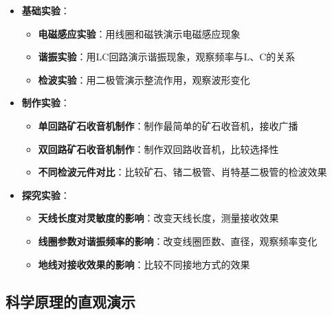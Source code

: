 \documentclass[12pt,UTF8]{ctexbook}
\begin{document}
\begin{itemize}[leftmargin=3.5em]
    \item \textbf{基础实验}：
        \begin{itemize}[leftmargin=3.5em]
            \item \textbf{电磁感应实验}：用线圈和磁铁演示电磁感应现象
            \item \textbf{谐振实验}：用LC回路演示谐振现象，观察频率与L、C的关系
            \item \textbf{检波实验}：用二极管演示整流作用，观察波形变化
        \end{itemize}
    \item \textbf{制作实验}：
        \begin{itemize}[leftmargin=3.5em]
            \item \textbf{单回路矿石收音机制作}：制作最简单的矿石收音机，接收广播
            \item \textbf{双回路矿石收音机制作}：制作双回路收音机，比较选择性
            \item \textbf{不同检波元件对比}：比较矿石、锗二极管、肖特基二极管的检波效果
        \end{itemize}
    \item \textbf{探究实验}：
        \begin{itemize}[leftmargin=3.5em]
            \item \textbf{天线长度对灵敏度的影响}：改变天线长度，测量接收效果
            \item \textbf{线圈参数对谐振频率的影响}：改变线圈匝数、直径，观察频率变化
            \item \textbf{地线对接收效果的影响}：比较不同接地方式的效果
        \end{itemize}
\end{itemize}

\subsection{科学原理的直观演示}
\end{document}
